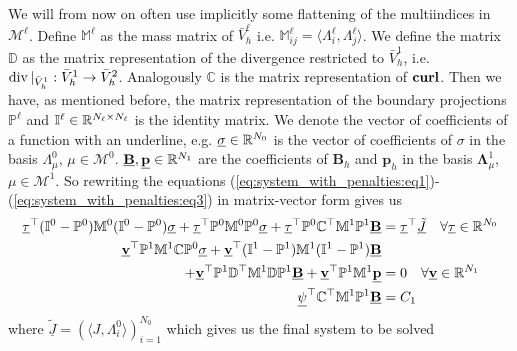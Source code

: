 \documentclass[../master_thesis.tex]{subfiles}
\begin{document}
We will from now on often use implicitly some flattening of the multiindices in $\mathcal{M}^\ell$.
Define $\mathbb{M}^\ell$ as the mass matrix 
of $\bar{V}_h^\ell$ i.e. $\mathbb{M}_{ij}^\ell = \langle \Lambda^\ell_i , \Lambda^\ell_j \rangle$.
We define the matrix $\mathbb{D}$ as the matrix representation of the 
divergence restricted to $\bar{V}^1_h$, i.e. $\operatorname{div}|_{\bar{V}^1_h}: \bar{V}^1_h \rightarrow \bar{V}^2_h$.
Analogously $\mathbb{C}$ is the matrix representation of $\veccurl$. Then 
we have, as mentioned before, the matrix representation of the boundary projections 
$\mathbb{P}^\ell$ and $\mathbb{I}^\ell \in \mathbb{R}^{N_\ell \times N_\ell}$ is the identity matrix.
We denote the vector of coefficients of a function with an underline, e.g. 
$\underline{\sigma} \in \mathbb{R}^{N_0}$ is the vector of coefficients of $\sigma$ in 
the basis $\Lambda^0_\mu$, $\mu \in \mathcal{M}^0$.
$\underline{\mathbf{B}}, \underline{\mathbf{p}} \in \mathbb{R}^{N_1}$ are the coefficients 
of $\mathbf{B}_h$ and $\mathbf{p}_h$ in the basis 
$\bm{\Lambda}^1_\mu$, $\mu \in \mathcal{M}^1$.
So rewriting the equations (\ref{eq:system_with_penalties:eq1})-(\ref{eq:system_with_penalties:eq3})
in matrix-vector form gives us
\begin{align*}
    \underline{\tau}^\top (\mathbb{I}^0-\mathbb{P}^0) \mathbb{M}^0 
        (\mathbb{I}^0-\mathbb{P}^0)\underline{\sigma} 
        + \underline{\tau}^\top \mathbb{P}^0 \mathbb{M}^0 \mathbb{P}^0 \underline{\sigma}
        + \underline{\tau}^\top \mathbb{P}^0 \mathbb{C} ^\top \mathbb{M}^1 \mathbb{P}^1 
        \underline{\mathbf{B}} &= \underline{\tau}^\top \underline{\tilde{J}} 
        \quad \forall \underline{\tau} \in \mathbb{R}^{N_0}
    \\ \underline{\mathbf{v}}^\top \mathbb{P}^1 \mathbb{M}^1 \mathbb{C} \mathbb{P}^0 \underline{\sigma}
        + \underline{\mathbf{v}}^\top (\mathbb{I}^1-\mathbb{P}^1) \mathbb{M}^1 
        (\mathbb{I}^1-\mathbb{P}^1)\underline{\mathbf{B}}
    \\ + \underline{\mathbf{v}}^\top \mathbb{P}^1 \mathbb{D}^\top \mathbb{M}^1 
        \mathbb{D} \mathbb{P}^1 \underline{\mathbf{B}} + \underline{\mathbf{v}}^\top \mathbb{P}^1 \mathbb{M}^1
        \underline{\mathbf{p}} &= 0 
        \quad \forall \underline{\mathbf{v}} \in \mathbb{R}^{N_1}
    \\ \underline{\psi}^\top \mathbb{C}^\top \mathbb{M}^1 \mathbb{P}^1 \underline{\mathbf{B}} &= C_1
\end{align*}
where $\underline{\tilde{J}} = (\langle J, \Lambda^0_i \rangle)_{i=1}^{N_0}$
which gives us the final system to be solved 
\end{document}

